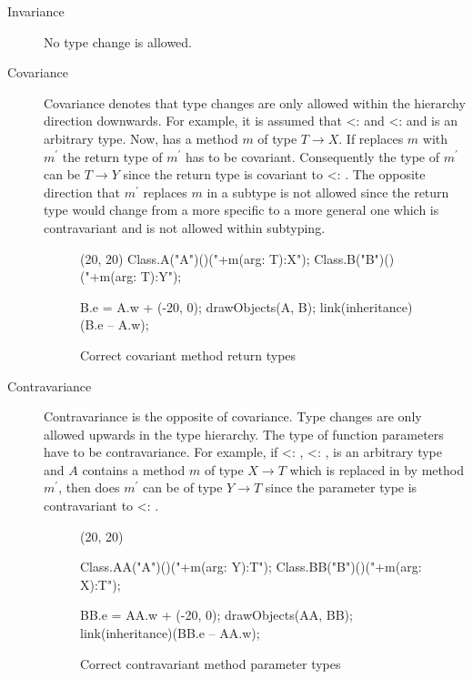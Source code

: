 \begin{description}
	\item[Invariance] No type change is allowed.
	\item[Covariance] Covariance denotes that type changes are only
	allowed within the hierarchy direction downwards. For example,
	it is assumed that \B <: \A and \Y <: \X and \T is an arbitrary
	type. Now, \A has a method $m$ of type $T \rightarrow X$. If
	\B replaces $m$ with $m^\prime$ the return type of $m^\prime$
	has to be covariant. Consequently the type of $m^\prime$ can be
	$T \rightarrow Y$ since the return type is covariant to \B <:
	\A. The opposite direction that $m^\prime$ replaces $m$ in a
	subtype is not allowed since the return type would change from
	a more specific to a more general one which is contravariant
	and is not allowed within subtyping.
	\begin{figure}[H]
		\centering
		\begin{emp}[classdiag](20, 20)
			Class.A("A")()("+m(arg: T):X");
			Class.B("B")()("+m(arg: T):Y");

			B.e = A.w + (-20, 0);
			drawObjects(A, B);
			link(inheritance)(B.e -- A.w);
		\end{emp}
		\caption{Correct covariant method return types}
		\label{fig:covariance}
	\end{figure}

	\item[Contravariance] Contravariance is the opposite of
	covariance. Type changes are only allowed upwards in the
	type hierarchy. The type of function parameters have to be
	contravariance.  For example, if \B <: \A, \Y <: \X, \T is
	an arbitrary type and $A$ contains a method $m$ of type $X
	\rightarrow T$ which is replaced in \B by method $m^\prime$,
	then does $m^\prime$ can be of type $Y \rightarrow T$ since the
	parameter type is contravariant to \B <: \A.
	\begin{figure}[H]
		\centering
		\begin{emp}[classdiag](20, 20)

			Class.AA("A")()("+m(arg: Y):T");
			Class.BB("B")()("+m(arg: X):T");

			BB.e = AA.w + (-20, 0);
			drawObjects(AA, BB);
			link(inheritance)(BB.e -- AA.w);

		\end{emp}
		\caption{Correct contravariant method parameter types}
		\label{fig:contravariance}
	\end{figure}
\end{description}

